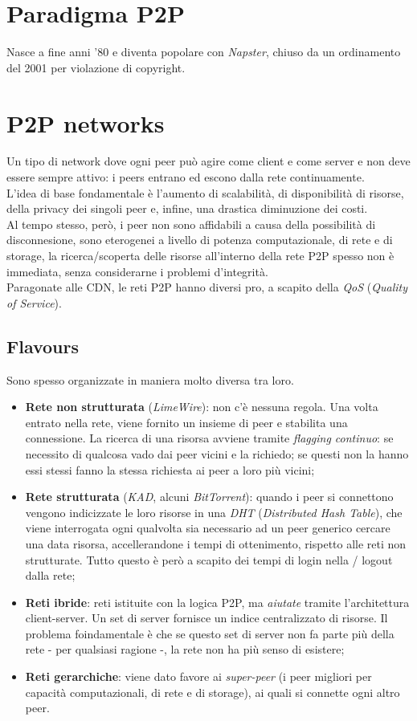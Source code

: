 \section{Paradigma P2P}
Nasce a fine anni '80 e diventa popolare con \textit{Napster}, chiuso da un ordinamento del 2001 per violazione di copyright. \\

\section{P2P networks}
Un tipo di network dove ogni peer può agire come client e come server e non deve essere sempre attivo: i peers entrano ed escono dalla rete continuamente. \\
L'idea di base fondamentale è l'aumento di scalabilità, di disponibilità di risorse, della privacy dei singoli peer e, infine, una drastica diminuzione dei costi. \\
Al tempo stesso, però, i peer non sono affidabili a causa della possibilità di disconnesione, sono eterogenei a livello di potenza computazionale, di rete e di storage, la ricerca/scoperta delle risorse all'interno della rete P2P spesso non è immediata, senza considerarne i problemi d'integrità. \\
Paragonate alle CDN, le reti P2P hanno diversi pro, a scapito della \textit{QoS} (\textit{Quality of Service}).

\subsection{Flavours}
Sono spesso organizzate in maniera molto diversa tra loro.
\begin{itemize}
    \item \textbf{Rete non strutturata} (\textit{LimeWire}): non c'è nessuna regola. Una volta entrato nella rete, viene fornito un insieme di peer e stabilita una connessione. La ricerca di una risorsa avviene tramite \textit{flagging continuo}: se necessito di qualcosa vado dai peer vicini e la richiedo; se questi non la hanno essi stessi fanno la stessa richiesta ai peer a loro più vicini;
    \item \textbf{Rete strutturata} (\textit{KAD}, alcuni \textit{BitTorrent}): quando i peer si connettono vengono indicizzate le loro risorse in una \textit{DHT} (\textit{Distributed Hash Table}), che viene interrogata ogni qualvolta sia necessario ad un peer generico cercare una data risorsa, accellerandone i tempi di ottenimento, rispetto alle reti non strutturate. Tutto questo è però a scapito dei tempi di login nella / logout dalla rete;
    \item \textbf{Reti ibride}: reti istituite con la logica P2P, ma \textit{aiutate} tramite l'architettura client-server. Un set di server fornisce un indice centralizzato di risorse. Il problema foindamentale è che se questo set di server non fa parte più della rete - per qualsiasi ragione -, la rete non ha più senso di esistere;
    \item \textbf{Reti gerarchiche}: viene dato favore ai \textit{super-peer} (i peer migliori per capacità computazionali, di rete e di storage), ai quali si connette ogni altro peer.
\end{itemize}


